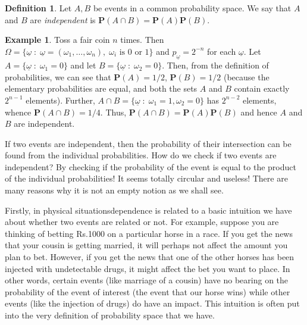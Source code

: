\documentclass[preprint,  11pt]{amsart}
\def\ome{\omega}
\theoremstyle{plain} %
\theoremstyle{definition} %
\newtheorem{definition}[theorem]{Definition}
\newtheorem{example}[theorem]{Example}
\begin{document}
{{{{{{{{{{{{{\begin{definition} Let $A,B$ be events in a common probability space. We say that $A$ and $B$ are {\em independent} is $\mathbf{P}(A\cap B)=\mathbf{P}(A)\mathbf{P}(B)$.
\end{definition}
\begin{example} Toss a fair coin $n$ times. Then $\Omega=\{\underline{\ome}{\; : \;} \underline{\ome}=(\omega_{1},\ldots ,\omega_{n}), \; \omega_{i}\mbox{ is }0\mbox{ or }1\}$ and $p_{\underline{\ome}}=2^{-n}$ for each $\underline{\ome}$. Let $A=\{\underline{\ome}{\; : \;} \omega_{1}=0\}$ and let $B=\{\underline{\ome}{\; : \;} \omega_{2}=0\}$. Then, from the definition of probabilities, we can see that $\mathbf{P}(A)=1/2$, $\mathbf{P}(B)=1/2$ (because the elementary probabilities are equal, and both the sets $A$ and $B$ contain exactly $2^{n-1}$ elements). Further, $A\cap B=\{\underline{\ome}{\; : \;} \omega_{1}=1, \omega_{2}=0\}$ has $2^{n-2}$ elements, whence $\mathbf{P}(A\cap B)=1/4$. Thus, $\mathbf{P}(A\cap B)=\mathbf{P}(A)\mathbf{P}(B)$ and hence $A$ and $B$ are independent.
\end{example}
If two events are independent, then the probability of their intersection can be found from the individual probabilities. How do we check if two events are independent? By checking if the probability of the event is equal to the product of the individual probabilities! It seems totally circular and useless! There are many reasons why it is not an empty notion as we shall see.

Firstly, in physical situationsdependence is related to a basic intuition we have about whether two events are related or not. For example, suppose you are thinking of betting Rs.1000 on a particular horse in a race. If you get the news that your cousin is getting married, it will perhaps not affect the amount you plan to bet. However, if you get the news that one of the other horses has been injected with undetectable drugs, it might affect the bet you want to place. In other words, certain events (like marriage of a cousin) have no bearing on the probability of the event of interest (the event that our horse wins) while other events (like the injection of drugs) do have an impact. This intuition is often put into the very definition of probability space that we have.

}}}}}}}}}}}}}
\end{document}

